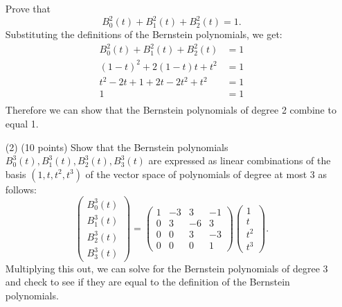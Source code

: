 \documentclass[12pt]{article}
\begin{document}
\begin{itemize}
Prove that
\[
B_0^2(t) +  B_1^2(t) +  B_2^2(t) = 1.
\]
Substituting the definitions of the Bernstein polynomials, we get:
\begin{align*}
    B_0^2(t) +  B_1^2(t) +  B_2^2(t) &= 1 \\
    (1 - t)^2 + 2(1 - t)t + t^2 &= 1 \\
    t^2 - 2t + 1 + 2t - 2t^2 + t^2 &= 1 \\
    1 &= 1 \\
\end{align*}
Therefore we can show that the Bernstein polynomials of degree 2 combine to equal 1.
\item[(2)](10 points)
Show that the Bernstein polynomials $B_0^3(t), B_1^3(t), B_2^3(t), B_3^3(t)$
are expressed as linear combinations of the basis
$(1, t, t^2, t^3)$ of the vector space of polynomials of degree at most $3$ 
as follows:
\[
\begin{pmatrix}
B_0^3(t)\\
B_1^3(t)\\
B_2^3(t) \\
B_3^3(t) 
\end{pmatrix} = 
\begin{pmatrix}
1 & -3  & 3 & -1 \\
0 &  3  & -6 & 3 \\
0 &  0  & 3  & -3 \\
0 &  0  & 0  & 1
\end{pmatrix} 
\begin{pmatrix}
1 \\
t \\
t^2\\
t^3
\end{pmatrix}. 
\]
Multiplying this out, we can solve for the Bernstein polynomials of degree 3 and check to see if they are equal to the definition of the Bernstein polynomials.


\end{itemize}
\end{document}
